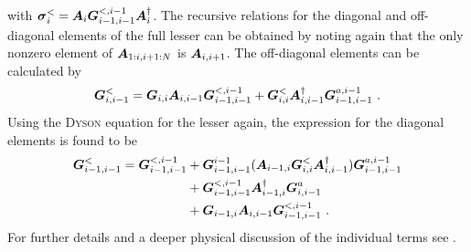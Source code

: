 with $\boldsymbol{\sigma}^<_i=\boldsymbol{A}_i\boldsymbol{G}^{<,i-1}_{i-1,i-1}\boldsymbol{A}^{\dagger}_i$. The recursive relations for the diagonal and off-diagonal elements of the full lesser \gfnc{} can be obtained by noting again that the only nonzero element of $\boldsymbol{A}_{1:i,i+1:N}$ is $\boldsymbol{A}_{i,i+1}$. The off-diagonal elements can be calculated by
\begin{align}
\boldsymbol{G}^<_{i,i-1} = \boldsymbol{G}_{i,i}\boldsymbol{A}_{i,i-1}\boldsymbol{G}^{<,i-1}_{i-1,i-1} +\boldsymbol{G}^<_{i,i}\boldsymbol{A}^{\dagger}_{i,i-1}\boldsymbol{G}^{a,i-1}_{i-1,i-1}\ .
\end{align}
Using the \textsc{Dyson} equation for the lesser \gfnc{} again, the expression for the diagonal elements is found to be
\begin{align}
\boldsymbol{G}^<_{i-1,i-1} = \boldsymbol{G}^{<,i-1}_{i-1,i-1} &+\boldsymbol{G}^{i-1}_{i-1,i-1}(\boldsymbol{A}_{i-1,i}\boldsymbol{G}^{<}_{i,i}\boldsymbol{A}^{\dagger}_{i,i-1})\boldsymbol{G}^{a,i-1}_{i-1,i-1}\notag \\
&+ \boldsymbol{G}^{<,i-1}_{i-1,i-1}\boldsymbol{A}^{\dagger}_{i-1,i}\boldsymbol{G}^a_{i,i-1}\notag \\
&+\boldsymbol{G}_{i-1,i}\boldsymbol{A}_{i,i-1}\boldsymbol{G}^{<,i-1}_{i-1,i-1}\ .
\end{align}
For further details and a deeper physical discussion of the individual terms see \cite{JApplPhys.91.2343}.
